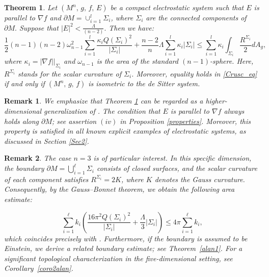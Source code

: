 \documentclass{amsart}
\newtheorem{theoremletter}{Theorem}
\newtheorem{remark}{Remark}
\numberwithin{equation}{section}
\begin{document}
	
	
\begin{theoremletter}
\label{Crusc_th}
		Let $(M^n,\, g,\, f,\, E)$ be a compact electrostatic system such that $E$ is parallel to $\nabla f$ and $\partial M=\cup_{i=1}^{l} \Sigma_{i}$, where $\Sigma_{i}$ are the connected components of $\partial M.$ Suppose that $\vert E\vert^{2}< \frac{\Lambda}{(n-2)}.$ Then we have:
		\begin{equation}\label{Crusc_eq}
			\frac{1}{2}(n-1)(n-2)\omega^{2}_{n-1}\sum_{i=1}^{l}  \frac{\kappa_{i}Q(\Sigma_i)^2}{\vert\Sigma_i\vert} +\frac{n-2}{n}\Lambda\sum_{i=1}^{l} \kappa_{i}|\Sigma_i|\leq\sum_{i=1}^{l} \kappa_{i} \int_{\Sigma_{i}}  \frac{R^{\Sigma_{i}}}{2}dA_g ,
		\end{equation}
		where $\kappa_{i}=|\nabla f|\Big|_{\Sigma_{i}}$ and $\omega_{n-1}$ is the area of the standard $(n-1)$-sphere. Here, $R^{\Sigma_{i}}$ stands for the scalar curvature of $\Sigma_{i}$. Moreover, equality holds in \eqref{Crusc_eq} if and only if $(M^n,\,g,\,f)$ is isometric to the de Sitter system.  
\end{theoremletter}	



\begin{remark}
We emphasize that Theorem \ref{Crusc_th} can be regarded as a higher-dimensional gene\-ra\-li\-zation of \cite[Theorem~E]{tiarlos}. The condition that \(E\) is parallel to \(\nabla f\) always holds along \(\partial M\); see assertion $(iv)$ in Proposition \ref{properties}. Moreover, this property is satisfied in all known explicit examples of electrostatic systems, as discussed in Section \ref{Sec2}.
\end{remark}





\begin{remark}\label{rem_n=3}
The case \(n = 3\) is of particular interest. In this specific dimension, the boundary \(\partial M = \bigcup_{i=1}^{\ell} \Sigma_{i}\) consists of closed surfaces, and the scalar curvature of each component satisfies \(R^{\Sigma_i} = 2K\), where \(K\) denotes the Gauss curvature. Consequently, by the Gauss–Bonnet theorem, we obtain the following area estimate:

\begin{equation*}
\sum_{i=1}^{\ell} k_i \left( \dfrac{16\pi^2 Q(\Sigma_i)^2}{|\Sigma_i|} + \dfrac{\Lambda}{3} |\Sigma_i| \right) \leq 4\pi \sum_{i=1}^{\ell} k_i,
\end{equation*} which coincides precisely with \cite[Theorem E]{tiarlos}. Furthermore, if the boundary is assumed to be Einstein, we derive a related boundary estimate; see Theorem~\ref{alan1}. For a significant topological characterization in the five-dimensional setting, see Corollary~\ref{coro2alan}.
\end{remark}
\end{document}
